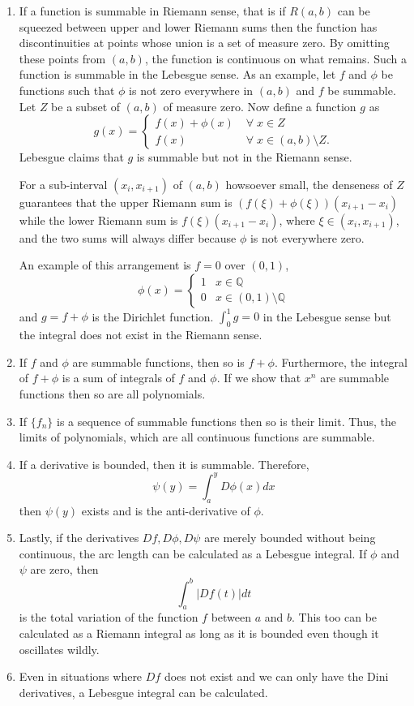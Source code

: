 \documentclass{article}
\theoremstyle{plain}
\numberwithin{thm}{section}
\theoremstyle{plain}
\numberwithin{prop}{section}
\theoremstyle{definition}
\numberwithin{defn}{section}
\theoremstyle{remark}
\begin{document}
\begin{enumerate}
\item If a function is summable in Riemann sense, that is if $R(a, b)$ can be
squeezed between upper and lower Riemann sums then the function has 
discontinuities at points whose union is a set of measure zero. By omitting
these points from $(a, b)$, the function is continuous on what remains. Such
a function is summable in the Lebesgue sense. As an example, let $f$ and $\phi$
be functions such that $\phi$ is not zero everywhere in $(a, b)$ and $f$ be 
summable. Let $Z$ be a subset of $(a, b)$ of measure zero. Now define a 
function $g$ as
\[
g(x) = \begin{cases} f(x) + \phi(x) & \;\forall\; x \in Z \\
f(x) & \;\forall\; x \in (a, b) \setminus Z.
\end{cases}
\]
Lebesgue claims that $g$ is summable but not in the Riemann sense.

For a sub-interval $(x_i, x_{i+1})$ of $(a, b)$ howsoever small, the denseness
of $Z$ guarantees that the upper Riemann sum is $(f(\xi) + \phi(\xi))(x_{i+1}
- x_i)$ while the lower Riemann sum is $f(\xi)(x_{i+1} - x_i)$, where $\xi \in
(x_i, x_{i+1})$, and the two sums will always differ because $\phi$ is not 
everywhere zero.

An example of this arrangement is $f = 0$ over $(0, 1)$, 
\[
\phi(x) = \begin{cases} 1 & x \in \mathbb{Q} \\
 0 & x \in (0, 1) \setminus \mathbb{Q}
\end{cases}
\]
and $g = f + \phi$ is the Dirichlet function. $\int_0^1 g = 0$ in the Lebesgue
sense but the integral does not exist in the Riemann sense.

\item If $f$ and $\phi$ are summable functions, then so is $f + \phi$. 
Furthermore, the integral of $f + \phi$ is a sum of integrals of $f$ and $\phi$.
If we show that $x^n$ are summable functions then so are all polynomials.

\item If $\{f_n\}$ is a sequence of summable functions then so is their limit.
Thus, the limits of polynomials, which are all continuous functions are 
summable.

\item If a derivative is bounded, then it is summable. Therefore, 
\[
\psi(y) = \int_a^y D\phi(x)dx
\]
then $\psi(y)$ exists and is the anti-derivative of $\phi$.

\item Lastly, if the derivatives $Df, D\phi, D\psi$ are merely bounded without
being continuous, the arc length can be calculated as a Lebesgue integral. If
$\phi$ and $\psi$ are zero, then 
\[
\int_a^b |Df(t)|dt
\]
is the total variation of the function $f$ between $a$ and $b$. This too can
be calculated as a Riemann integral as long as it is bounded even though it
oscillates wildly.

\item Even in situations where $Df$ does not exist and we can only have the 
Dini derivatives, a Lebesgue integral can be calculated.

\end{enumerate}
\end{document}

